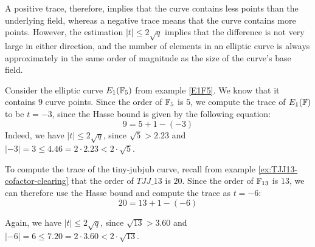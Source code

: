 A positive trace, therefore, implies that the curve contains less points than the underlying field, whereas a negative trace means that the curve contains more points. However, the estimation $|t| \leq 2\sqrt{q}$ implies that the difference is not very large in either direction, and the number of elements in an elliptic curve is always approximately in the same order of magnitude as the size of the curve's base field.

\begin{example}\label{ex:E1F5-frobenius} Consider the elliptic curve $E_1(\mathbb{F}_5)$ from example \ref{E1F5}. We know that it contains $9$ curve points. Since the order of $\mathbb{F}_5$ is $5$, we compute the trace of $E_1(\mathbb{F})$ to be $t=-3$, since the Hasse bound is given by the following equation:
$$
9 = 5 + 1 - (-3)
$$
Indeed, we have $|t| \leq 2\sqrt{q}$, since $\sqrt{5}> 2.23$ and 
$|-3|= 3 \leq 4.46 = 2\cdot 2.23< 2\cdot \sqrt{5}$.
\end{example}

\begin{example}\label{ex:TJJ13-frobenius} To compute the trace of the tiny-jubjub curve, recall from example \ref{ex:TJJ13-cofactor-clearing} that the order of $\mathit{TJJ\_13}$ is $20$. Since the order of $\mathbb{F}_{13}$ is $13$, we can therefore use the Hasse bound and compute the trace as $t=-6$:
\begin{equation}
20 = 13 + 1 - (-6)
\end{equation}

Again, we have $|t| \leq 2\sqrt{q}$, since $\sqrt{13}> 3.60$ and 
$|-6|= 6 \leq 7.20 = 2\cdot 3.60< 2\cdot \sqrt{13}$.
\end{example}

